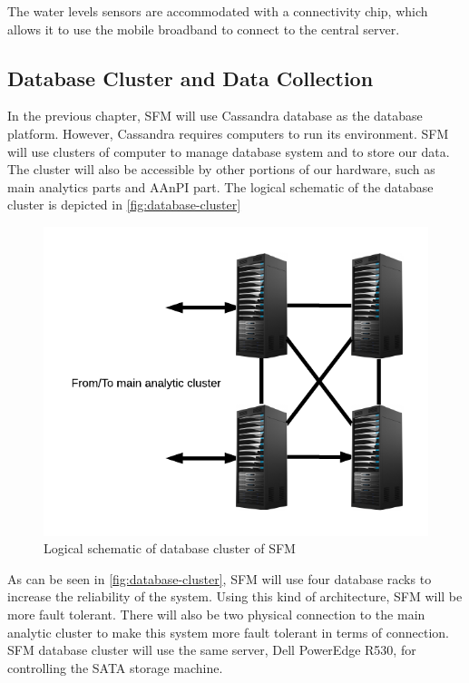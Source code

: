 The water levels sensors are accommodated with a connectivity chip, which allows it to use the mobile broadband to connect to the central server.


\subsection{Database Cluster and Data Collection}
\label{subsec:database-data}
In the previous chapter, SFM will use Cassandra database as the database platform. However, Cassandra requires computers to run its environment. SFM will use clusters of computer to manage database system and to store our data. The cluster will also be accessible by other portions of our hardware, such as main analytics parts and AAnPI part. The logical schematic of the database cluster is depicted in \autoref{fig:database-cluster}

\begin{figure}[hb!]
\centering
\includegraphics[]{6-hardware/images/db-cluster.png}
\caption{Logical schematic of database cluster of SFM}
\label{fig:database-cluster}
\end{figure}

As can be seen in \autoref{fig:database-cluster}, SFM will use four database racks to increase the reliability of the system. Using this kind of architecture, SFM will be more fault tolerant. There will also be two physical connection to the main analytic cluster to make this system more fault tolerant in terms of connection. SFM database cluster will use the same server, Dell PowerEdge R530, for controlling the SATA storage machine.


